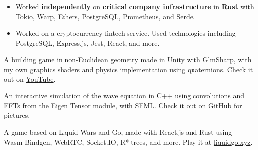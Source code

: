 \documentclass[10pt,a4paper,ragged2e]{altacv}
\begin{document}
\begin{paracol}{2}


	\begin{itemize}
		\item Worked \textbf{independently} on \textbf{critical company infrastructure} in \textbf{Rust} with Tokio, Warp, Ethers, PostgreSQL, Prometheus, and Serde.
	\end{itemize}

	\medskip

	\begin{itemize}
		\item Worked on a cryptocurrency fintech service. Used technologies including PostgreSQL, Express.js, Jest, React, and more.
	\end{itemize}

% 



	\medskip



	A building game in non-Euclidean geometry made in Unity with GlmSharp, with my own graphics shaders and physics implementation using quaternions. Check it out on \href{https://youtu.be/MtrgYVnKpGE}{YouTube}.

	\medskip

	An interactive simulation of the wave equation in C++ using convolutions and FFTs from the Eigen Tensor module, with SFML. Check it out on \href{https://github.com/akriegman/WaveSimulation}{GitHub} for pictures.

	\medskip

	A game based on Liquid Wars and Go, made with React.js and Rust using Wasm-Bindgen, WebRTC, Socket.IO, R*-trees, and more. Play it at \href{http://liquidgo.xyz}{liquidgo.xyz}.


\end{paracol}
\end{document}
